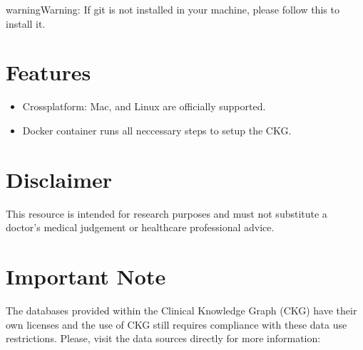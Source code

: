 \documentclass[letterpaper,10pt,english]{sphinxmanual}
\begin{document}
\begin{sphinxadmonition}{warning}{Warning:}
If git is not installed in your machine, please follow this  to install it.
\end{sphinxadmonition}


\section{Features}
\label{\detokenize{INTRO:features}}\begin{itemize}
\item {} 
Cross\sphinxhyphen{}platform: Mac, and Linux are officially supported.

\item {} 
Docker container runs all neccessary steps to setup the CKG.

\end{itemize}


\section{Disclaimer}
\label{\detokenize{INTRO:disclaimer}}
This resource is intended for research purposes and must not substitute a doctor’s medical judgement or healthcare professional advice.


\section{Important Note}
\label{\detokenize{INTRO:important-note}}
The databases provided within the Clinical Knowledge Graph (CKG) have their own licenses and the use of CKG still requires compliance with these data use restrictions. Please, visit the data sources directly for more information:
\end{document}
